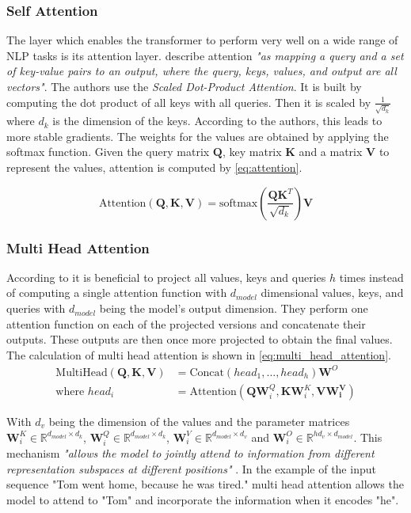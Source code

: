 \subsubsection{Self Attention}
The layer which enables the transformer to perform very well on a wide range of \ac{NLP} tasks is its attention layer.
\Textcite{Vaswani:2017} describe attention \textit{"as mapping a query and a set of key-value pairs to an output, where the query, keys, values, and output are all vectors"}.
The authors use the \textit{Scaled Dot-Product Attention}.
It is built by computing the dot product of all keys with all queries.
Then it is scaled by $\frac{1}{\sqrt{d_k}}$ where $d_k$ is the dimension of the keys.
According to the authors, this leads to more stable gradients.
The weights for the values are obtained by applying the softmax function.
Given the query matrix $\bm{Q}$, key matrix $\bm{K}$ and a matrix $\bm{V}$ to represent the values, attention is computed by \cref{eq:attention}.


\begin{equation}\label{eq:attention}
    \text{Attention}(\bm{Q},\bm{K},\bm{V}) = \text{softmax}(\frac{\bm{Q}\bm{K}^T}{\sqrt{d_k}}) \bm{V}
\end{equation}

\subsubsection{Multi Head Attention}
According to \textcite{Vaswani:2017} it is beneficial to project all values, keys and queries $h$ times instead of computing a single attention function with $d_{model}$ dimensional values, keys, and queries with $d_{model}$ being the model's output dimension.
They perform one attention function on each of the projected versions and concatenate their outputs.
These outputs are then once more projected to obtain the final values.
The calculation of multi head attention is shown in \cref{eq:multi_head_attention}.
\begin{equation}\label{eq:multi_head_attention}
    \begin{aligned}
        \text{MultiHead}(\bm{Q},\bm{K},\bm{V}) &= \text{Concat}(head_1,\dots, head_h)\bm{W}^O\\
        \text{where }head_i &= \text{Attention}(\bm{Q}\bm{W}^Q_i, \bm{K}\bm{W}^K_i, \bm{V}\bm{W^V_i})
    \end{aligned}
\end{equation}

With $d_v$ being the dimension of the values and the parameter matrices $\bm{W}^K_i \in \mathbb{R}^{d_{model} \times d_k}$, $\bm{W}^Q_i \in \mathbb{R}^{d_{model} \times d_k}$, $\bm{W}^V_i \in \mathbb{R}^{d_{model} \times d_v}$ and $\bm{W}^O_i \in \mathbb{R}^{hd_v \times d_{model}}$.
This mechanism \textit{"allows the model to jointly attend to information from different representation subspaces at different positions"} \parencite{Vaswani:2017}.
In the example of the input sequence "Tom went home, because he was tired." multi head attention allows the model to attend to "Tom" and incorporate the information when it encodes "he".
